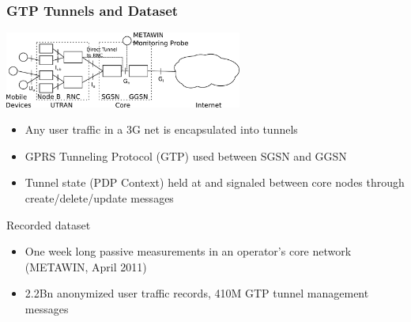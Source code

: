 \documentclass{beamer}
\begin{document}
\begin{frame}
    \frametitle{GTP Tunnels and Dataset}

      \begin{center}
		\includegraphics[height=2.5cm]{figures/umts-network.pdf}
	\end{center}


    \begin{itemize}
		\item Any user traffic in a 3G net is encapsulated into tunnels
		\item GPRS Tunneling Protocol (GTP) used between SGSN and GGSN
		\item Tunnel state (PDP Context) held at and signaled between core nodes through create/delete/update messages
	\end{itemize}
	Recorded dataset
	\begin{itemize}
		\item One week long passive measurements in an operator's core network (METAWIN, April 2011)
		\item 2.2Bn anonymized user traffic records, 410M GTP tunnel management messages
	\end{itemize}
\end{frame}
\end{document}
